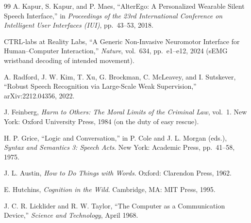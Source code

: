 \documentclass[11pt,oneside]{book}
\theoremstyle{plain}
\theoremstyle{definition}
\theoremstyle{remark}
\begin{document}
\begin{thebibliography}{99}
 A. Kapur, S. Kapur, and P. Maes, ``AlterEgo: A Personalized Wearable Silent Speech Interface,'' in \emph{Proceedings of the 23rd International Conference on Intelligent User Interfaces (IUI)}, pp.~43--53, 2018.

 CTRL-labs at Reality Labs, ``A Generic Non-Invasive Neuromotor Interface for Human--Computer Interaction,'' \emph{Nature}, vol.~634, pp.~e1--e12, 2024 (sEMG wristband decoding of intended movement).

 A. Radford, J. W. Kim, T. Xu, G. Brockman, C. McLeavey, and I. Sutskever, ``Robust Speech Recognition via Large-Scale Weak Supervision,'' arXiv:2212.04356, 2022.

 J. Feinberg, \emph{Harm to Others: The Moral Limits of the Criminal Law}, vol.~1. New York: Oxford University Press, 1984 (on the duty of easy rescue).

 H. P. Grice, ``Logic and Conversation,'' in P. Cole and J. L. Morgan (eds.), \emph{Syntax and Semantics 3: Speech Acts}. New York: Academic Press, pp.~41--58, 1975.

 J. L. Austin, \emph{How to Do Things with Words}. Oxford: Clarendon Press, 1962.

 E. Hutchins, \emph{Cognition in the Wild}. Cambridge, MA: MIT Press, 1995.

 J. C. R. Licklider and R. W. Taylor, ``The Computer as a Communication Device,'' \emph{Science and Technology}, April 1968.

\end{thebibliography}
\end{document}
